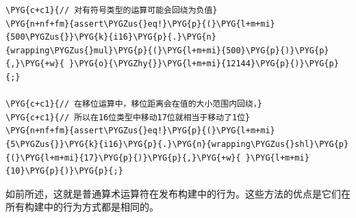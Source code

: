 \begin{itemize}
\begin{Verbatim}[commandchars=\\\{\},breaklines=true,breakanywhere=true,fontsize=\codefont,xleftmargin=17bp]
\PYG{c+c1}{// 对有符号类型的运算可能会回绕为负值}
\PYG{n+nf+fm}{assert\PYGZus{}eq!}\PYG{p}{(}\PYG{l+m+mi}{500\PYGZus{}}\PYG{k}{i16}\PYG{p}{.}\PYG{n}{wrapping\PYGZus{}mul}\PYG{p}{(}\PYG{l+m+mi}{500}\PYG{p}{)}\PYG{p}{,}\PYG{+w}{ }\PYG{o}{\PYGZhy{}}\PYG{l+m+mi}{12144}\PYG{p}{)}\PYG{p}{;}

\PYG{c+c1}{// 在移位运算中，移位距离会在值的大小范围内回绕，}
\PYG{c+c1}{// 所以在16位类型中移动17位就相当于移动了1位}
\PYG{n+nf+fm}{assert\PYGZus{}eq!}\PYG{p}{(}\PYG{l+m+mi}{5\PYGZus{}}\PYG{k}{i16}\PYG{p}{.}\PYG{n}{wrapping\PYGZus{}shl}\PYG{p}{(}\PYG{l+m+mi}{17}\PYG{p}{)}\PYG{p}{,}\PYG{+w}{ }\PYG{l+m+mi}{10}\PYG{p}{)}\PYG{p}{;}
\end{Verbatim}

\end{itemize}

如前所述，这就是普通算术运算符在发布构建中的行为。这些方法的优点是它们在所有构建中的行为方式都是相同的。

